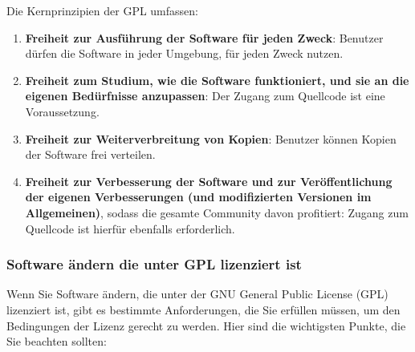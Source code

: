 \documentclass{vorlage-design-main}
\begin{document}
Die Kernprinzipien der GPL umfassen:

\begin{enumerate}
\def\labelenumi{\arabic{enumi}.}

\item
  \textbf{Freiheit zur Ausführung der Software für jeden Zweck}:
  Benutzer dürfen die Software in jeder Umgebung, für jeden Zweck
  nutzen.
\item
  \textbf{Freiheit zum Studium, wie die Software funktioniert, und sie
  an die eigenen Bedürfnisse anzupassen}: Der Zugang zum Quellcode ist
  eine Voraussetzung.
\item
  \textbf{Freiheit zur Weiterverbreitung von Kopien}: Benutzer können
  Kopien der Software frei verteilen.
\item
  \textbf{Freiheit zur Verbesserung der Software und zur
  Veröffentlichung der eigenen Verbesserungen (und modifizierten
  Versionen im Allgemeinen)}, sodass die gesamte Community davon
  profitiert: Zugang zum Quellcode ist hierfür ebenfalls erforderlich.
\end{enumerate}

\hypertarget{software-uxe4ndern-die-unter-gpl-lizenziert-ist}{%
\subsubsection{Software ändern die unter GPL lizenziert
ist}\label{software-aendern-die-unter-gpl-lizenziert-ist}}

Wenn Sie Software ändern, die unter der GNU General Public License (GPL)
lizenziert ist, gibt es bestimmte Anforderungen, die Sie erfüllen
müssen, um den Bedingungen der Lizenz gerecht zu werden. Hier sind die
wichtigsten Punkte, die Sie beachten sollten:
\end{document}
